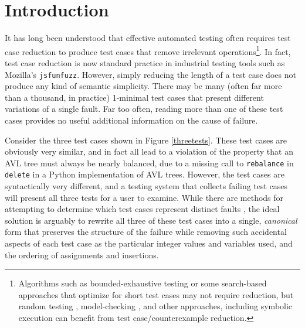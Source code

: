 \section{Introduction}

It has long been understood that effective automated testing often requires
test case reduction \cite{DD,MinUnit,TCminim,ICSEDiff} to produce test cases
that remove irrelevant operations\footnote{Algorithms such as
  bounded-exhaustive testing \cite{SoftBET} or some search-based approaches that
  optimize for short test cases \cite{FA11} may not require reduction, but random
  testing \cite{RandFormal,HamletOnly}, model-checking \cite{Gastin04minimizationof}, and other
  approaches, including symbolic execution \cite{issta14} can benefit from
  test case/counterexample reduction.}.  In fact, test case reduction is
now standard practice in industrial testing tools such as Mozilla's
{\tt jsfunfuzz}.  However, simply reducing the length of a test case
does not produce any kind of semantic simplicity.  There may be many
(often far more than a thousand, in practice) 1-minimal test cases
that present different variations of a single fault.  Far too often,
reading more than one of these test cases provides no useful
additional information on the cause of failure.

Consider the three test cases shown in Figure \ref{threetests}.  These
test cases are obviously very similar, and in fact all lead to a
violation of the property that an AVL tree must always be nearly
balanced, due to a missing call to {\tt rebalance} in {\tt delete} in
a Python implementation of AVL trees.  However, the test cases are
syntactically very different, and a testing system that collects
failing test cases will present all three tests for a user to examine.
While there are methods for attempting to determine which test cases
represent distinct faults \cite{PLDI13}, the ideal solution is
arguably to rewrite all three of these test cases into a single,
\emph{canonical} form that preserves the structure of the failure while removing
such accidental aspects of each test case as the particular integer
values and variables used, and the ordering of assignments and
insertions.

